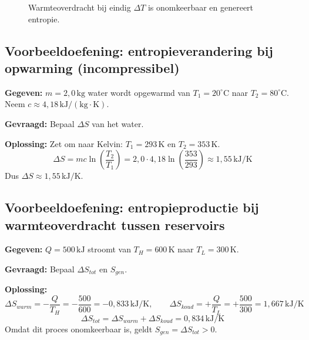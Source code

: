 \documentclass[a4paper,11pt,twoside]{report}
\begin{document}
\begin{figure}[H]
    \centering
    \caption{Warmteoverdracht bij eindig $\Delta T$ is onomkeerbaar en genereert entropie.}
\end{figure}

\subsection*{Voorbeeldoefening: entropieverandering bij opwarming (incompressibel)}
        	\textbf{Gegeven:} $m=2{,}0\,\mathrm{kg}$ water wordt opgewarmd van $T_1=20^\circ\mathrm{C}$ naar $T_2=80^\circ\mathrm{C}$. Neem $c\approx 4{,}18\,\mathrm{kJ/(kg\cdot K)}$.

        	\textbf{Gevraagd:} Bepaal $\Delta S$ van het water.

        	\textbf{Oplossing:}
Zet om naar Kelvin: $T_1=293\,\mathrm{K}$ en $T_2=353\,\mathrm{K}$.
\[
\Delta S=m c\ln\left(\frac{T_2}{T_1}\right)=2{,}0\cdot 4{,}18\ln\left(\frac{353}{293}\right)\approx 1{,}55\,\mathrm{kJ/K}
\]
Dus $\boxed{\Delta S\approx 1{,}55\,\mathrm{kJ/K}}$.

\subsection*{Voorbeeldoefening: entropieproductie bij warmteoverdracht tussen reservoirs}
        	\textbf{Gegeven:} $Q=500\,\mathrm{kJ}$ stroomt van $T_H=600\,\mathrm{K}$ naar $T_L=300\,\mathrm{K}$.

        	\textbf{Gevraagd:} Bepaal $\Delta S_{tot}$ en $S_{gen}$.

        	\textbf{Oplossing:}
\[
\Delta S_{warm}=-\frac{Q}{T_H}=-\frac{500}{600}=-0{,}833\,\mathrm{kJ/K},\qquad
\Delta S_{koud}=+\frac{Q}{T_L}=+\frac{500}{300}=1{,}667\,\mathrm{kJ/K}
\]
\[
\Delta S_{tot}=\Delta S_{warm}+\Delta S_{koud}=0{,}834\,\mathrm{kJ/K}
\]
Omdat dit proces onomkeerbaar is, geldt $S_{gen}=\Delta S_{tot}>0$.
\end{document}
